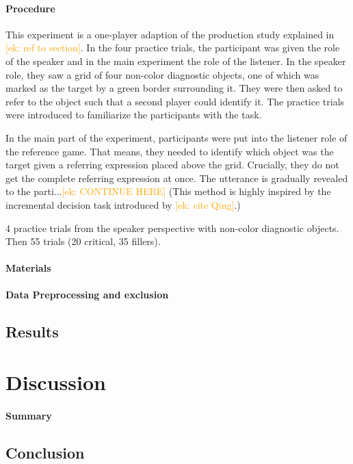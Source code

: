 \documentclass[a4paper,man,floatsintext,natbib,donotrepeattitle]{apa6}
\newcommand{\ek}[1]{\textcolor{Orange}{[ek: #1]}}
\begin{document}
\paragraph{Procedure}
This experiment is a one-player adaption of the production study explained in \ek{ref to section}. In the four practice trials, the participant was given the role of the speaker and in the main experiment the role of the listener. In the speaker role, they saw a grid of four non-color diagnostic objects, one of which was marked as the target by a green border surrounding it. They were then asked to refer to the object such that a second player could identify it. The practice trials were introduced to familiarize the participants with the task.

In the main part of the experiment, participants were put into the listener role of the reference game. That means, they needed to identify which object was the target given a referring expression placed above the grid. Crucially, they do not get the complete referring expression at once. The utterance is gradually revealed to the parti...\ek{CONTINUE HERE} (This method is highly inspired by the incremental decision task introduced by \ek{cite Qing}.)

4 practice trials from the speaker perspective with non-color diagnostic objects. Then 55 trials (20 critical, 35 fillers).

\paragraph{Materials}

\paragraph{Data Preprocessing and exclusion}

\subsection{Results}

\section{Discussion}

\paragraph{Summary}

\subsection{Conclusion}
\end{document}
